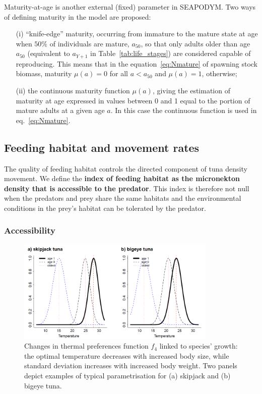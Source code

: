 \vspace{0.1cm}
Maturity-at-age is another external (fixed) parameter in SEAPODYM. Two ways of defining maturity in the model are proposed: 
\vspace{-0.1cm}
\begin{itemize}
\item[(i)] ``knife-edge'' maturity, occurring from immature to the mature state at age when $50\%$ of individuals are mature, $a_{50}$, so that only adults older than age $a_{50}$ (equivalent to $a_{Y+1}$ in Table~\ref{tab:life_stages}) are considered capable of reproducing. This means that in the equation~\ref{eq:Nmature} of spawning stock biomass, maturity $\mu(a)=0$ for all $a<a_{50}$ and $\mu(a)=1$, otherwise;
\item[(ii)] the continuous maturity function $\mu(a)$, giving the estimation of maturity at age expressed in values between 0 and 1 equal to the portion of mature adults at a given age $a$. In this case the continuous function is used in eq.~\ref{eq:Nmature}. 
\end{itemize}


\subsection{Feeding habitat and movement rates}

The quality of feeding habitat controls the directed component of tuna density movement. We define the \textbf{index of feeding habitat as the micronekton density that is accessible to the predator}. This index is therefore not null when the predators and prey share the same habitats and the environmental conditions in the prey's habitat can be tolerated by the predator. 

\subsubsection{Accessibility}\label{sec:accessibility}

\begin{figure}%
	\centering
        \includegraphics[width=0.85\textwidth]{chapter1/figs/thermal-preference}
	\caption{Changes in thermal preferences function $f_4$ linked to species' growth: the optimal temperature decreases with increased body size, while standard deviation increases with increased body weight. Two panels depict examples of typical parametrisation for (a) skipjack and (b) bigeye tuna.}
	\label{fig:thermal-preference}
\end{figure}


